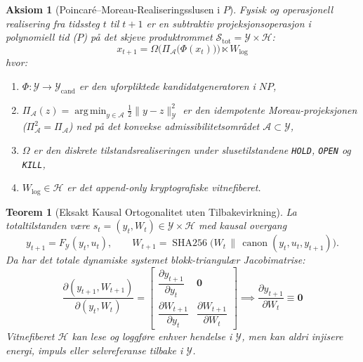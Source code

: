 \documentclass[11pt,a4paper,oneside]{book}
\newtheorem{aksiom}{Aksiom}[chapter]
\newtheorem{teorem}{Teorem}[chapter]
\theoremstyle{definition}
\begin{document}
\begin{aksiom}[Poincaré--Moreau-Realiseringsslusen i $P$]
Fysisk og operasjonell realisering fra tidssteg $t$ til $t+1$ er en subtraktiv projeksjonsoperasjon i polynomiell tid ($P$) på det skjeve produktrommet $\mathcal{S}_{\text{tot}} = \mathcal{Y} \times \mathcal{H}$:
\begin{equation}\label{eq:master_gate}
\boxed{x_{t+1} = \Omega\!\Big(\Pi_{\mathcal{A}}\big(\Phi(x_t)\big)\Big) \ltimes W_{\text{log}}}
\end{equation}
hvor:
\begin{enumerate}
    \item $\Phi : \mathcal{Y} \to \mathcal{Y}_{\text{cand}}$ er den uforpliktede kandidatgeneratoren i $NP$,
    \item $\Pi_{\mathcal{A}}(z) = \operatorname*{arg\,min}_{y \in \mathcal{A}} \frac{1}{2}\|y - z\|_{\mathcal{Y}}^2$ er den idempotente Moreau-projeksjonen ($\Pi_{\mathcal{A}}^2 = \Pi_{\mathcal{A}}$) ned på det konvekse admissibilitetsområdet $\mathcal{A} \subset \mathcal{Y}$,
    \item $\Omega$ er den diskrete tilstandsrealiseringen under slusetilstandene \texttt{HOLD}, \texttt{OPEN} og \texttt{KILL},
    \item $W_{\text{log}} \in \mathcal{H}$ er det append-only kryptografiske vitnefiberet.
\end{enumerate}
\end{aksiom}

\begin{teorem}[Eksakt Kausal Ortogonalitet uten Tilbakevirkning]
La totaltilstanden være $s_t = (y_t, W_t) \in \mathcal{Y} \times \mathcal{H}$ med kausal overgang
\begin{equation}
y_{t+1} = F_{\mathcal{Y}}(y_t, u_t), \qquad W_{t+1} = \operatorname{SHA256}\!\big(W_t \,\|\, \operatorname{canon}(y_t, u_t, y_{t+1})\big).
\end{equation}
Da har det totale dynamiske systemet blokk-triangulær Jacobimatrise:
\begin{equation}
\frac{\partial(y_{t+1}, W_{t+1})}{\partial(y_t, W_t)} =
\begin{bmatrix}
\dfrac{\partial y_{t+1}}{\partial y_t} & \mathbf{0} \\[10pt]
\dfrac{\partial W_{t+1}}{\partial y_t} & \dfrac{\partial W_{t+1}}{\partial W_t}
\end{bmatrix}
\implies
\boxed{\frac{\partial y_{t+1}}{\partial W_t} \equiv \mathbf{0}}
\end{equation}
Vitnefiberet $\mathcal{H}$ kan lese og loggføre enhver hendelse i $\mathcal{Y}$, men kan aldri injisere energi, impuls eller selvreferanse tilbake i $\mathcal{Y}$.
\end{teorem}
\end{document}
